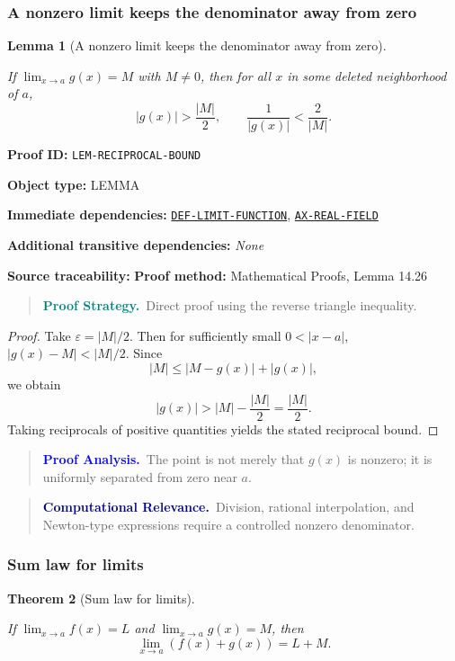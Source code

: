\documentclass[10pt]{article}
\newcommand{\pidraw}[1]{\begingroup\urlstyle{tt}\nolinkurl{#1}\endgroup}
\newcommand{\pidref}[1]{\hyperref[prf:#1]{\pidraw{#1}}}
\newtheorem{theorem}{Theorem}[section]
\newtheorem{lemma}[theorem]{Lemma}
\theoremstyle{definition}
\theoremstyle{remark}
\newenvironment{proofstrategy}
{\begin{quote}\small\noindent\textbf{\textcolor{teal}{Proof Strategy.}}\ }
{\end{quote}}
\newenvironment{proofanalysis}
{\begin{quote}\small\noindent\textbf{\textcolor{blue}{Proof Analysis.}}\ }
{\end{quote}}
\newenvironment{computationalrelevance}
{\begin{quote}\small\noindent\textbf{\textcolor{navy}{Computational Relevance.}}\ }
{\end{quote}}
\newcommand{\meta}[2]{\noindent\textbf{#1:} #2\par}
\begin{document}
\subsubsection{A nonzero limit keeps the denominator away from zero}

\begin{lemma}[A nonzero limit keeps the denominator away from zero]\label{prf:LEM-RECIPROCAL-BOUND}

If $\lim_{x\to a}g(x)=M$ with $M\ne0$, then for all $x$ in some deleted neighborhood of $a$,
\[
|g(x)|>\frac{|M|}{2},\qquad \frac1{|g(x)|}<\frac2{|M|}.
\]

\end{lemma}

\meta{Proof ID}{\pidraw{LEM-RECIPROCAL-BOUND}}
\meta{Object type}{LEMMA}
\meta{Immediate dependencies}{\pidref{DEF-LIMIT-FUNCTION}, \pidref{AX-REAL-FIELD}}
\meta{Additional transitive dependencies}{\emph{None}}
\meta{Source traceability}{\textbf{Proof method:} Mathematical Proofs, Lemma 14.26}

\begin{proofstrategy}Direct proof using the reverse triangle inequality.\end{proofstrategy}

\begin{proof}

Take $\varepsilon=|M|/2$. Then for sufficiently small $0<|x-a|$,
$|g(x)-M|<|M|/2$. Since
\[
|M|\le |M-g(x)|+|g(x)|,
\]
we obtain
\[
|g(x)|>|M|-\frac{|M|}{2}=\frac{|M|}{2}.
\]
Taking reciprocals of positive quantities yields the stated reciprocal bound.

\end{proof}

\begin{proofanalysis}The point is not merely that $g(x)$ is nonzero; it is uniformly separated from zero near $a$.\end{proofanalysis}

\begin{computationalrelevance}Division, rational interpolation, and Newton-type expressions require a controlled nonzero denominator.\end{computationalrelevance}

\subsubsection{Sum law for limits}

\begin{theorem}[Sum law for limits]\label{prf:THM-LIMIT-SUM}

If $\lim_{x\to a}f(x)=L$ and $\lim_{x\to a}g(x)=M$, then
\[
\lim_{x\to a}(f(x)+g(x))=L+M.
\]

\end{theorem}
\end{document}
